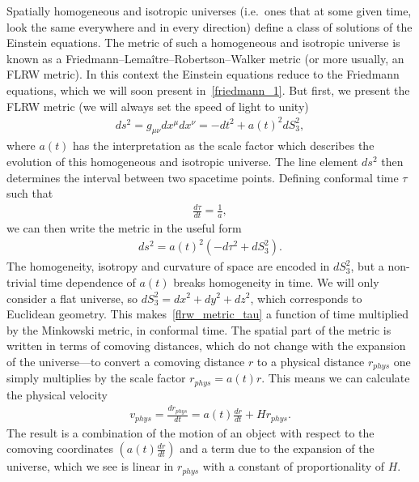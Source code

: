     Spatially homogeneous and isotropic universes (i.e.\ ones that at some given
    time, look the same everywhere and in every direction)
    define a class of solutions of the Einstein equations.
    The metric of such a homogeneous and isotropic universe
    is known as a Friedmann–Lemaître–Robertson–Walker metric
    (or more usually, an FLRW metric). In this context
    the Einstein equations reduce to the Friedmann equations, which we will soon present
    in~\eqref{friedmann_1}.
    But first, we present the FLRW metric (we will always set the speed of light to unity)
    \begin{align}\label{flrw_metric}
        ds^2 = g_{\mu\nu}dx^{\mu}dx^{\nu} = - dt^2 + a(t)^2 dS_3^2,
    \end{align}
    where $a(t)$ has the interpretation as the scale factor
    which describes the evolution of this homogeneous and isotropic universe.
    The line element $ds^2$ then determines the interval between two spacetime points.
    Defining conformal time $\tau$ such that
    \begin{align}\label{conformal_time_defn}
        \frac{d\tau}{dt} = \frac{1}{a},
    \end{align}
    we can then write the metric in the useful form
    \begin{align}\label{flrw_metric_tau}
        ds^2 = a(t)^2\left(-d\tau^2 + dS_3^2\right).
    \end{align}
    The homogeneity, isotropy and curvature of space are encoded in $dS^2_3$,
    but a non-trivial time dependence of $a(t)$ breaks homogeneity in time.
    We will only consider a flat universe, so $dS_3^2=dx^2+dy^2+dz^2$,
    which corresponds to Euclidean geometry.
    This makes~\eqref{flrw_metric_tau} a function of time multiplied by the Minkowski metric,
    in conformal time.
    The spatial part of the metric is written in terms of comoving distances, which
    do not change with the expansion of the universe---to convert a comoving distance $r$
    to a physical distance $r_{phys}$ one simply multiplies by the scale factor $r_{phys}=a(t)r$.
    This means we can calculate the physical velocity
    \begin{align}
        v_{phys} = \frac{dr_{phys}}{dt} = a(t)\frac{dr}{dt}+Hr_{phys}.
    \end{align}
    The result is a combination of the motion of an object with respect to the comoving coordinates
    $\left(a(t)\frac{dr}{dt}\right)$ and a term due to the expansion of the universe, which we see is linear
    in $r_{phys}$ with a constant of proportionality of $H$.


